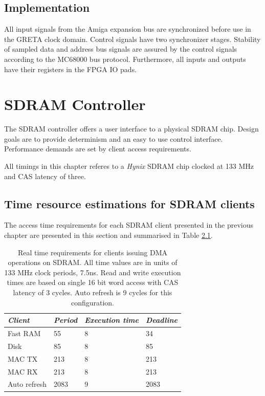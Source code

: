 \documentclass[a4paper]{report}
\begin{document}
\section{Implementation}
All input signals from the Amiga expansion bus are synchronized
before use in the GRETA clock domain. Control signals have two
synchronizer stages. Stability of sampled data and address
bus signals are assured by the control signals according to
the MC68000 bus protocol. Furthermore, all inputs and outputs
have their registers in the FPGA IO pads.

\chapter{SDRAM Controller}
The SDRAM controller offers a user interface to a physical
SDRAM chip.  Design goals are to provide determinism and an
easy to use control interface.  Performance demands are set
by client access requirements.

All timings in this chapter referes to a \emph{Hynix} SDRAM
chip clocked at 133 MHz and CAS latency of three.

\section{Time resource estimations for SDRAM clients}
The access time requirements for each SDRAM client presented
in the previous chapter are presented in this section and
summarised in Table \ref{sdram_clients}.

\begin{table}
\begin{tabular}{*4l}    \toprule
\emph{Client} & \emph{Period} & \emph{Execution time} & \emph{Deadline} \\
\midrule
Fast RAM      & 55    & 8 & 34   \\
Disk          & 85    & 8 & 85   \\
MAC TX        & 213   & 8 & 213  \\
MAC RX        & 213   & 8 & 213  \\
Auto refresh  & 2083  & 9 & 2083 \\
\bottomrule
 \hline
\end{tabular}
\caption{Real time requirements for clients issuing DMA
operations on SDRAM.  All time values are in units of 133 MHz
clock periods, 7.5ns.  Read and write execution times are based on single 16
bit word access with CAS latency of 3 cycles. Auto refresh is 9 cycles
for this configuration.}
\label{sdram_clients}
\end{table}
\end{document}
